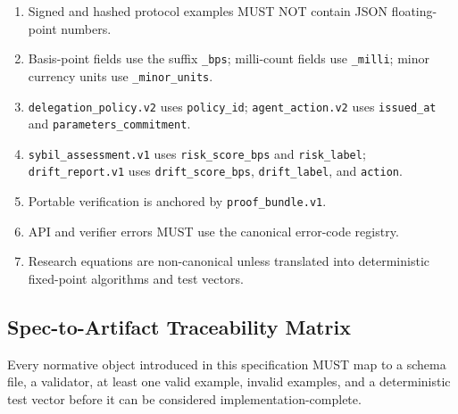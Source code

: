 \documentclass[11pt]{article}
\begin{document}
\begin{enumerate}
    \item Signed and hashed protocol examples MUST NOT contain JSON floating-point numbers.
    \item Basis-point fields use the suffix \texttt{\_bps}; milli-count fields use \texttt{\_milli}; minor currency units use \texttt{\_minor\_units}.
    \item \texttt{delegation\_policy.v2} uses \texttt{policy\_id}; \texttt{agent\_action.v2} uses \texttt{issued\_at} and \texttt{parameters\_commitment}.
    \item \texttt{sybil\_assessment.v1} uses \texttt{risk\_score\_bps} and \texttt{risk\_label}; \texttt{drift\_report.v1} uses \texttt{drift\_score\_bps}, \texttt{drift\_label}, and \texttt{action}.
    \item Portable verification is anchored by \texttt{proof\_bundle.v1}.
    \item API and verifier errors MUST use the canonical error-code registry.
    \item Research equations are non-canonical unless translated into deterministic fixed-point algorithms and test vectors.
\end{enumerate}

\subsection{Spec-to-Artifact Traceability Matrix}

Every normative object introduced in this specification MUST map to a schema file, a validator, at least one valid example, invalid examples, and a deterministic test vector before it can be considered implementation-complete.
\end{document}
